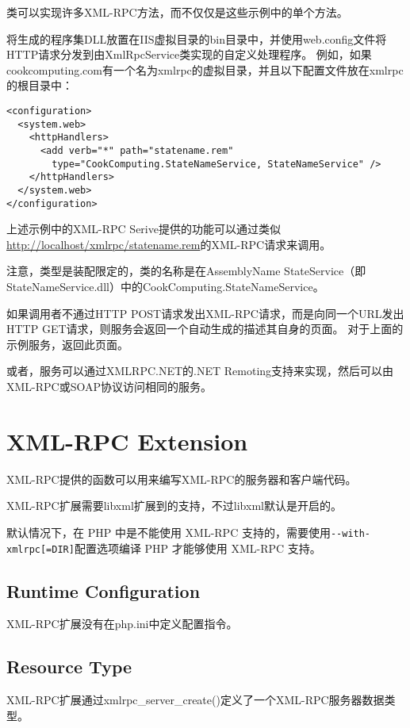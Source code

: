 类可以实现许多XML-RPC方法，而不仅仅是这些示例中的单个方法。

将生成的程序集DLL放置在IIS虚拟目录的bin目录中，并使用web.config文件将HTTP请求分发到由XmlRpcService类实现的自定义处理程序。 例如，如果cookcomputing.com有一个名为xmlrpc的虚拟目录，并且以下配置文件放在xmlrpc的根目录中：


\begin{lstlisting}
<configuration>
  <system.web>
    <httpHandlers>
      <add verb="*" path="statename.rem" 
        type="CookComputing.StateNameService, StateNameService" />
    </httpHandlers>
  </system.web> 
</configuration>
\end{lstlisting}


上述示例中的XML-RPC Serive提供的功能可以通过类似\url{http://localhost/xmlrpc/statename.rem}的XML-RPC请求来调用。

注意，类型是装配限定的，类的名称是在AssemblyName StateService（即StateNameService.dll）中的CookComputing.StateNameService。

如果调用者不通过HTTP POST请求发出XML-RPC请求，而是向同一个URL发出HTTP GET请求，则服务会返回一个自动生成的描述其自身的页面。 对于上面的示例服务，返回此页面。

或者，服务可以通过XMLRPC.NET的.NET Remoting支持来实现，然后可以由XML-RPC或SOAP协议访问相同的服务。

\chapter{XML-RPC Extension}

XML-RPC提供的函数可以用来编写XML-RPC的服务器和客户端代码。

XML-RPC扩展需要libxml扩展到的支持，不过libxml默认是开启的。

默认情况下，在 PHP 中是不能使用 XML-RPC 支持的，需要使用\texttt{-\/-with-xmlrpc[=DIR]}配置选项编译 PHP 才能够使用 XML-RPC 支持。



\section{Runtime Configuration}


XML-RPC扩展没有在php.ini中定义配置指令。


\section{Resource Type}


XML-RPC扩展通过xmlrpc\_server\_create()定义了一个XML-RPC服务器数据类型。


